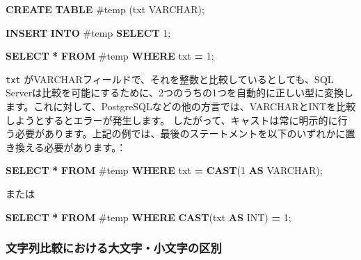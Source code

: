 \documentclass[
  11pt]{book}
\newenvironment{Shaded}{\begin{snugshade}}{\end{snugshade}}
\newcommand{\DataTypeTok}[1]{\textcolor[rgb]{0.13,0.29,0.53}{#1}}
\newcommand{\DecValTok}[1]{\textcolor[rgb]{0.00,0.00,0.81}{#1}}
\newcommand{\FunctionTok}[1]{\textcolor[rgb]{0.13,0.29,0.53}{\textbf{#1}}}
\newcommand{\KeywordTok}[1]{\textcolor[rgb]{0.13,0.29,0.53}{\textbf{#1}}}
\newcommand{\NormalTok}[1]{#1}
\newcommand{\OperatorTok}[1]{\textcolor[rgb]{0.81,0.36,0.00}{\textbf{#1}}}
\newcommand{\StringTok}[1]{\textcolor[rgb]{0.31,0.60,0.02}{#1}}
\theoremstyle{definition}
\theoremstyle{definition}
\theoremstyle{definition}
\theoremstyle{definition}
\theoremstyle{remark}
\begin{document}
\begin{Shaded}
\begin{Highlighting}[]
\KeywordTok{CREATE} \KeywordTok{TABLE}\NormalTok{ \#temp (txt }\DataTypeTok{VARCHAR}\NormalTok{);}

\KeywordTok{INSERT} \KeywordTok{INTO}\NormalTok{ \#temp}
\KeywordTok{SELECT} \StringTok{\textquotesingle{}1\textquotesingle{}}\NormalTok{;}

\KeywordTok{SELECT} \OperatorTok{*} \KeywordTok{FROM}\NormalTok{ \#temp }\KeywordTok{WHERE}\NormalTok{ txt }\OperatorTok{=} \DecValTok{1}\NormalTok{;}
\end{Highlighting}
\end{Shaded}

\texttt{txt} がVARCHARフィールドで、それを整数と比較しているとしても、SQL Serverは比較を可能にするために、2つのうちの1つを自動的に正しい型に変換します。これに対して、PostgreSQLなどの他の方言では、VARCHARとINTを比較しようとするとエラーが発生します。 したがって、キャストは常に明示的に行う必要があります。上記の例では、最後のステートメントを以下のいずれかに置き換える必要があります。：

\begin{Shaded}
\begin{Highlighting}[]
\KeywordTok{SELECT} \OperatorTok{*} \KeywordTok{FROM}\NormalTok{ \#temp }\KeywordTok{WHERE}\NormalTok{ txt }\OperatorTok{=} \FunctionTok{CAST}\NormalTok{(}\DecValTok{1} \KeywordTok{AS} \DataTypeTok{VARCHAR}\NormalTok{);}
\end{Highlighting}
\end{Shaded}

または

\begin{Shaded}
\begin{Highlighting}[]
\KeywordTok{SELECT} \OperatorTok{*} \KeywordTok{FROM}\NormalTok{ \#temp }\KeywordTok{WHERE} \FunctionTok{CAST}\NormalTok{(txt }\KeywordTok{AS} \DataTypeTok{INT}\NormalTok{) }\OperatorTok{=} \DecValTok{1}\NormalTok{;}
\end{Highlighting}
\end{Shaded}

\subsubsection*{文字列比較における大文字・小文字の区別}\label{ux6587ux5b57ux5217ux6bd4ux8f03ux306bux304aux3051ux308bux5927ux6587ux5b57ux5c0fux6587ux5b57ux306eux533aux5225}
\end{document}
